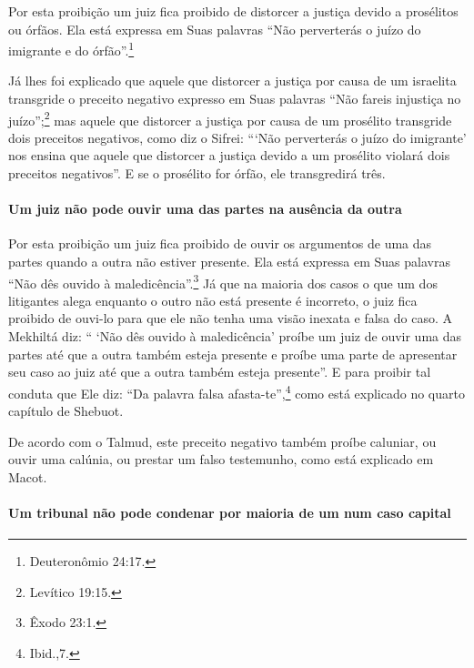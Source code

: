 Por esta proibição um juiz fica proibido de distorcer a justiça devido
a prosélitos ou órfãos. Ela está expressa em Suas palavras ``Não
perverterás o juízo do imigrante e do órfão''.\footnote{Deuteronômio 24:17.}

Já lhes foi explicado que aquele que distorcer a justiça por causa de um
israelita transgride o preceito negativo expresso em Suas palavras ``Não
fareis injustiça no juízo'';\footnote{Levítico 19:15.} mas aquele que distorcer
a justiça por causa de um prosélito transgride dois preceitos negativos,
como diz o Sifrei: ```Não perverterás o juízo do imigrante' nos ensina
que aquele que distorcer a justiça devido a um prosélito violará dois
preceitos negativos''. E se o prosélito for órfão, ele transgredirá
três.

\paragraph{Um juiz não pode ouvir uma das partes na ausência da outra}

Por esta proibição um juiz fica proibido de ouvir os argumentos de uma
das partes quando a outra não estiver presente. Ela está expressa em
Suas palavras ``Não dês ouvido à maledicência''.\footnote{Êxodo 23:1.} Já que na
maioria dos casos o que um dos litigantes alega enquanto o outro não
está presente é incorreto, o juiz fica proibido de ouvi-lo para que ele
não tenha uma visão inexata e falsa do caso. A Mekhiltá diz: `` `Não dês
ouvido à maledicência' proíbe um juiz de ouvir uma das partes até que a
outra também esteja presente e proíbe uma parte de apresentar seu caso
ao juiz até que a outra também esteja presente''. E para proibir tal
conduta que Ele diz: ``Da palavra falsa afasta-te'',\footnote{Ibid.,7.} como está
explicado no quarto capítulo de Shebuot.

De acordo com o Talmud, este preceito negativo também proíbe caluniar,
ou ouvir uma calúnia, ou prestar um falso testemunho, como está
explicado em Macot.

\paragraph{Um tribunal não pode condenar por maioria de um num caso capital}

